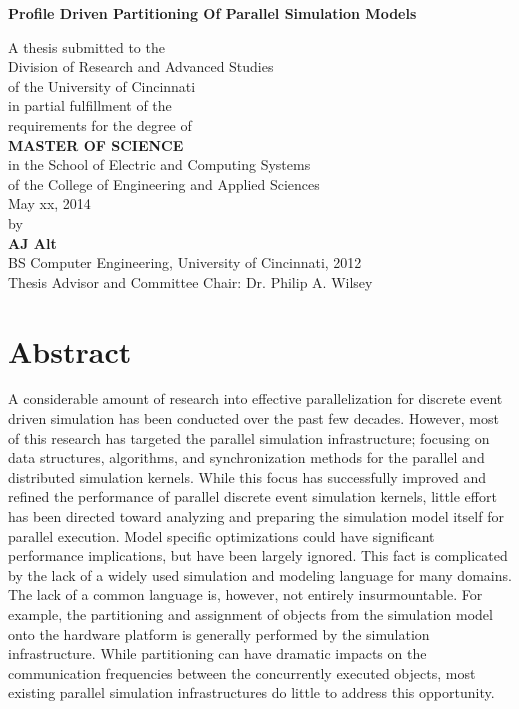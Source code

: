 \documentclass[11pt]{book}
\begin{document}
\thispagestyle{empty}

\doublespacing

\vspace*{0.5in}

\begin{center}
\LARGE{\textbf{Profile Driven Partitioning Of Parallel Simulation Models}}

\vspace*{0.4in}

  {\large A thesis submitted to the\\[0.20in]
    Division of Research and Advanced Studies\\
    of the University of Cincinnati\\[0.20in]
    in partial fulfillment of the\\
    requirements for the degree of\\[0.20in]
    {\bf MASTER OF SCIENCE}\\[0.20in]
    in the School of Electric and Computing Systems\\
    of the College of Engineering and Applied Sciences\\[0.20in]
    May xx, 2014\\[0.20in]
    by\\[0.20in]
    {\bf AJ Alt}\\
    BS Computer Engineering, University of Cincinnati, 2012\\}
  \vspace{0.5in}
  {\large Thesis Advisor and Committee Chair:  Dr. Philip A. Wilsey}
\end{center}

\clearpage

\setcounter{page}{1}
\clearpage

\chapter*{Abstract} 

A considerable amount of research into effective parallelization for discrete event driven simulation has been conducted over the past few decades. However, most of this research has targeted the parallel simulation infrastructure; focusing on data structures, algorithms, and synchronization methods for the parallel and distributed simulation kernels. While this focus has successfully improved and refined the performance of parallel discrete event simulation kernels, little effort has been directed toward analyzing and preparing the simulation model itself for parallel execution. Model specific optimizations could have significant performance implications, but have been largely ignored. This fact is complicated by the lack of a widely used simulation and modeling language for many domains. The lack of a common language is, however, not entirely insurmountable. For example, the partitioning and assignment of objects from the simulation model onto the hardware platform is generally performed by the simulation infrastructure. While partitioning can have dramatic impacts on the communication frequencies between the concurrently executed objects, most existing parallel simulation infrastructures do little to address this opportunity.
\end{document}

